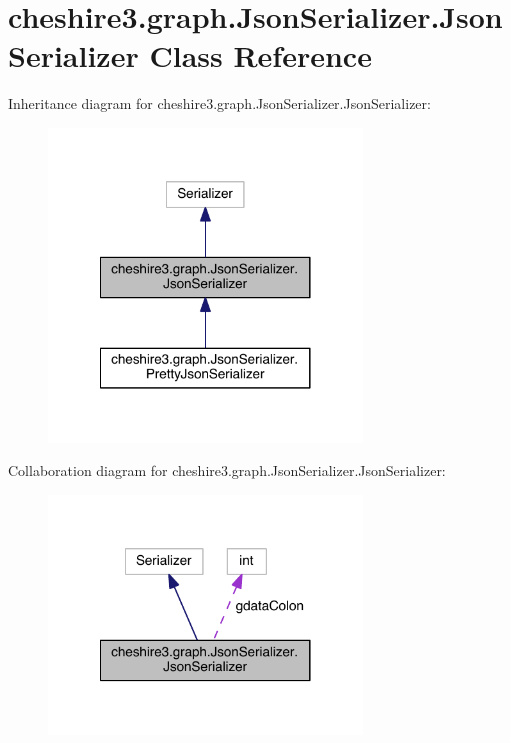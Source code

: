 \hypertarget{classcheshire3_1_1graph_1_1_json_serializer_1_1_json_serializer}{\section{cheshire3.\-graph.\-Json\-Serializer.\-Json\-Serializer Class Reference}
\label{classcheshire3_1_1graph_1_1_json_serializer_1_1_json_serializer}
}


Inheritance diagram for cheshire3.\-graph.\-Json\-Serializer.\-Json\-Serializer\-:
\nopagebreak
\begin{figure}[H]
\begin{center}
\leavevmode
\includegraphics[width=236pt]{classcheshire3_1_1graph_1_1_json_serializer_1_1_json_serializer__inherit__graph}
\end{center}
\end{figure}


Collaboration diagram for cheshire3.\-graph.\-Json\-Serializer.\-Json\-Serializer\-:
\nopagebreak
\begin{figure}[H]
\begin{center}
\leavevmode
\includegraphics[width=236pt]{classcheshire3_1_1graph_1_1_json_serializer_1_1_json_serializer__coll__graph}
\end{center}
\end{figure}
